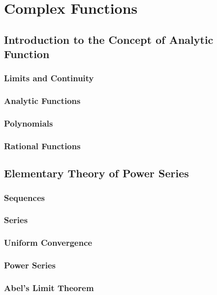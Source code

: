 \chapter{Complex Functions}\label{ch:cfn}
\section{Introduction to the Concept of Analytic Function}
\subsection{Limits and Continuity}

\subsection{Analytic Functions}

\subsection{Polynomials}

\subsection{Rational Functions}

\section{Elementary Theory of Power Series}
\subsection{Sequences}

\subsection{Series}

\subsection{Uniform Convergence}

\subsection{Power Series}

\subsection{Abel's Limit Theorem}

